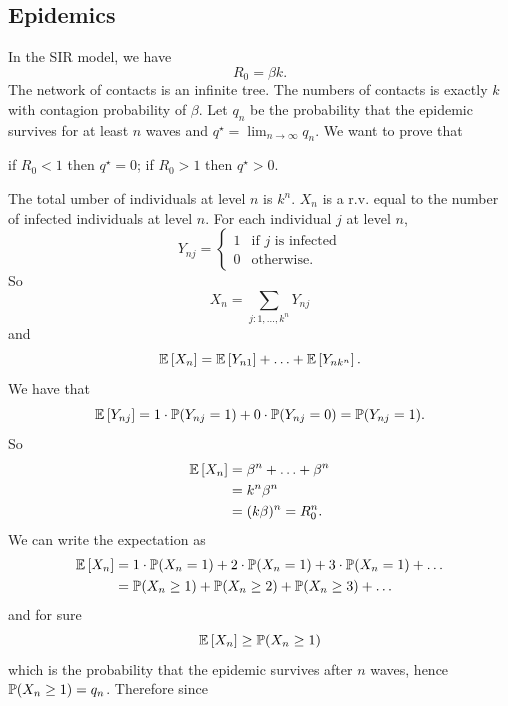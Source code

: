 \documentclass[a4paper,9pt]{extarticle}
\begin{document}
\begin{multicols*}{2}
	\section{Epidemics}
	In the SIR model, we have
	\begin{equation*}
		R_{0}=\beta k.
	\end{equation*}
	The network of contacts is an infinite tree. The numbers of contacts is exactly $k$ with contagion probability of $\beta$. Let $q_{n}$ be the probability that the epidemic survives for at least $n$ waves and $q^{\star}=\lim_{n\to\infty}q_{n}$. We want to prove that 
	\begin{riquadro}
		if $R_{0}<1$ then $q^{\star}=0$; if $R_{0}>1$ then $q^{\star}>0$.
	\end{riquadro}
	The total umber of individuals at level $n$ is $k^{n}$. $X_{n}$ is a r.v. equal to the number of infected individuals at level $n$. For each individual $j$ at level $n$, $$Y_{nj}=\begin{cases}
	1&\text{if $j$ is infected}\\
	0&\text{otherwise}.
	\end{cases}$$
	So
	\begin{equation*}
		X_{n}=\sum_{j:1,\ldots,k^{n}}Y_{nj}
	\end{equation*}
	and
	\begin{equation*}
		\mathbb{E}\left[X_{n}\right]=\mathbb{E}\left[Y_{n1}\right]+\ldots+\mathbb{E}\left[Y_{nk^{n}}\right].
	\end{equation*}
	We have that
	\begin{equation*}
		\mathbb{E}\left[Y_{nj}\right]=1\cdot\mathbb{P}(Y_{nj}=1)+0\cdot\mathbb{P}(Y_{nj}=0)=\mathbb{P}(Y_{nj}=1).
	\end{equation*}
	So
	\begin{align*}
		\mathbb{E}\left[X_{n}\right]&=\beta^{n}+\ldots+\beta^{n}\\
		&=k^{n}\beta^{n}\\
		&=(k\beta)^{n}=R^{n}_{0}.
	\end{align*}
	We can write the expectation as
	\begin{align*}
		\mathbb{E}\left[X_{n}\right]&=1\cdot\mathbb{P}(X_{n}=1)+2\cdot\mathbb{P}(X_{n}=1)+3\cdot\mathbb{P}(X_{n}=1)+\ldots\\
		&=\mathbb{P}(X_{n}\geq1)+\mathbb{P}(X_{n}\geq2)+\mathbb{P}(X_{n}\geq3)+\ldots
	\end{align*}
	and for sure
	\begin{equation*}
		\mathbb{E}\left[X_{n}\right]\geq\mathbb{P}(X_{n}\geq1)
	\end{equation*}
	which is the probability that the epidemic survives after $n$ waves, hence $\mathbb{P}(X_{n}\geq 1)=q_{n}$. Therefore since
	\begin{equation*}

\end{equation*}
\end{multicols*}
\end{document}
